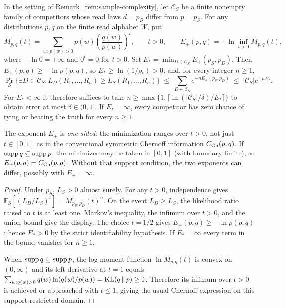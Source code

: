 \begin{proposition}
\label{prop:chernoff-refinement}
In the setting of Remark~\ref{rem:sample-complexity}, let
$\mathcal C_S$ be a finite nonempty family of competitors whose read laws
$d=p_D$ differ from $p=p_S$. For any distributions $p,q$ on the
finite read alphabet $W$, put
\[
 M_{p,q}(t)=\sum_{w:\,p(w)>0}
     p(w)\left(\frac{q(w)}{p(w)}\right)^t,\qquad t>0,
 \qquad
 E_+(p,q)=-\ln\inf_{t>0}M_{p,q}(t),
\]
where $-\ln 0=+\infty$ and $0^t=0$ for $t>0$.
Set $E_*=\min_{D\in\mathcal C_S}E_+(p_S,p_D)$.
Then $E_+(p,q)\ge-\ln\rho(p,q)$, so
$E_*\ge\ln(1/\rho_*)>0$; and, for every integer $n\ge1$,
\[
 \Pr_S\{\exists D\in\mathcal C_S:
          L_D(R_1,\ldots,R_n)\ge L_S(R_1,\ldots,R_n)\}
 \;\le\;\sum_{D\in\mathcal C_S}e^{-nE_+(p_S,p_D)}
 \;\le\;|\mathcal C_S|e^{-nE_*}.
\]
For $E_*<\infty$ it therefore suffices to take
$n\ge\max\{1,\lceil\ln(|\mathcal C_S|/\delta)/E_*\rceil\}$
to obtain error at most $\delta\in(0,1]$.
If $E_*=\infty$, every competitor has zero chance of tying or
beating the truth for every $n\ge1$.

The exponent $E_+$ is \emph{one-sided}: the minimization ranges over
$t>0$, not just $t\in[0,1]$ as in the conventional symmetric
Chernoff information $C_{\rm Ch}(p,q)$.
If $\operatorname{supp} q\subseteq\operatorname{supp} p$, the minimizer may be taken in
$[0,1]$ (with boundary limits), so
$E_+(p,q)=C_{\rm Ch}(p,q)$. Without that support condition, the
two exponents can differ, possibly with $E_+=\infty$.
\end{proposition}
\begin{proof}
Under $p_S$, $L_S>0$ almost surely. For any $t>0$, independence gives
$\mathbb E_S[(L_D/L_S)^t]=M_{p_S,p_D}(t)^n$.
On the event $L_D\ge L_S$, the likelihood ratio raised to $t$ is at
least one. Markov's inequality, the infimum over $t>0$, and the union
bound give the display. The choice $t=1/2$ gives
$E_+(p,q)\ge-\ln\rho(p,q)$; hence $E_*>0$ by the strict
identifiability hypothesis. If $E_*=\infty$ every term in the
bound vanishes for $n\ge1$.

When $\operatorname{supp} q\subseteq\operatorname{supp} p$, the log moment function
$\ln M_{p,q}(t)$ is convex on $(0,\infty)$ and
its left derivative at $t=1$ equals
$\sum_{w:q(w)>0}q(w)\ln(q(w)/p(w))
=\operatorname{KL}(q\,\|\,p)\ge0$. Therefore its infimum over $t>0$
is achieved or approached with $t\le1$, giving the usual Chernoff
expression on this support-restricted domain.
\end{proof}

